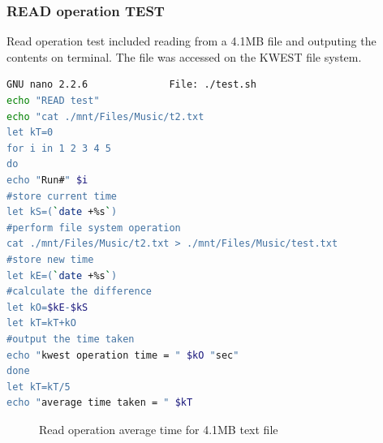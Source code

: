 \newpage
\subsubsection{READ operation TEST}
Read operation test included reading from a 4.1MB file and outputing the contents on terminal. The file was accessed on the KWEST file system.
\begin{lstlisting}[language=bash,frame=single]
GNU nano 2.2.6              File: ./test.sh                                   
echo "READ test"
echo "cat ./mnt/Files/Music/t2.txt 
let kT=0
for i in 1 2 3 4 5 
do
echo "Run#" $i
#store current time
let kS=(`date +%s`)
#perform file system operation
cat ./mnt/Files/Music/t2.txt > ./mnt/Files/Music/test.txt
#store new time
let kE=(`date +%s`)
#calculate the difference
let kO=$kE-$kS
let kT=kT+kO
#output the time taken
echo "kwest operation time = " $kO "sec"
done
let kT=kT/5
echo "average time taken = " $kT
\end{lstlisting}
\begin{figure}[htb]
\centering
\setlength\fboxsep{0pt}
\setlength\fboxrule{0.5pt}
\caption{Read operation average time for 4.1MB text file}
\label{fig:dfd0}
\end{figure}

